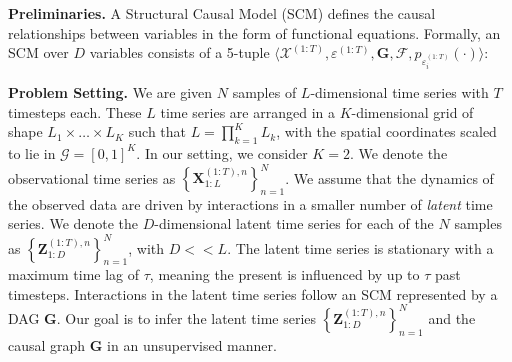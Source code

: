 \textbf{{Preliminaries.}} {A Structural Causal Model \citep{Pearl_2009} (SCM) defines the causal relationships between variables in the form of functional equations. Formally, an SCM over $D$ variables  consists of a 5-tuple $\displaystyle \langle \mathcal{X}^{(1:T)}, \varepsilon^{(1:T)}, \mathbf{G}, \mathcal{F}, p_{\varepsilon_i^{(1:T)}}(\cdot) \rangle$:}

\textbf{Problem Setting.}
We are given $N$ samples of $L$-dimensional time series with $T$ timesteps each. These $L$ time series are arranged in a $K$-dimensional grid of shape $L_1 \times \ldots \times L_K$ such that $L=\prod_{k=1}^K L_k$, with the spatial coordinates scaled to lie in $\mathcal{G} = [0, 1]^K$. In our setting, we consider $K=2$. We denote the observational time series as $\left\{\mathbf{X}^{(1:T), n}_{1:L} \right\}_{n=1}^{N}$. We assume that the dynamics of the observed data are driven by interactions in a smaller number of \textit{latent} time series. We denote the $D$-dimensional latent time series for each of the $N$ samples as $\left\{ \mathbf{Z}^{(1:T), n}_{1:D} \right\}_{n=1}^N$, with $D << L$. The latent time series is stationary with a maximum time lag of $\tau$, meaning the present is influenced by up to $\tau$ past timesteps. Interactions in the latent time series follow an SCM represented by a DAG $\mathbf{G}$. Our goal is to infer the latent time series $\left\{ \mathbf{Z}^{(1:T), n}_{1:D} \right\}_{n=1}^N$ and the causal graph $\mathbf{G}$ in an unsupervised manner.

